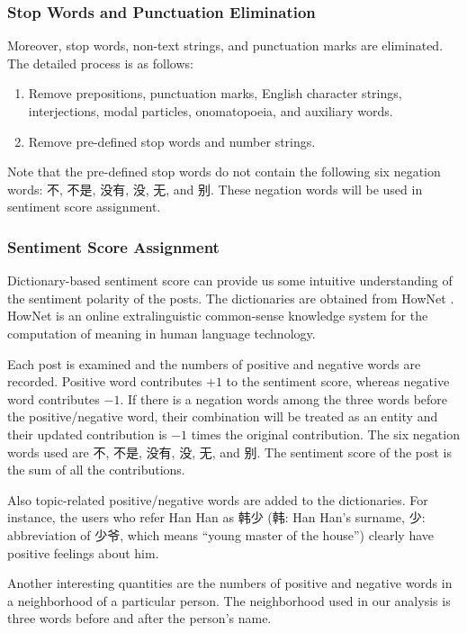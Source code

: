 \documentclass[11pt]{article}
\newcommand{\1}[1]{{\mathbf 1}\left\{#1\right\}}        %
\begin{document}
\subsubsection{Stop Words and Punctuation Elimination}
Moreover, stop words, non-text strings, and punctuation marks are eliminated. The detailed process is as follows: 
\begin{enumerate}
\item  Remove prepositions, punctuation marks, English character strings, interjections, modal particles, onomatopoeia, and auxiliary words.
\item Remove pre-defined stop words and number strings.
\end{enumerate}
Note that the pre-defined stop words do not contain the following six negation words:  不, 不是, 没有, 没, 无, and 别. These negation words will be used in sentiment score assignment.


\subsubsection{Sentiment Score Assignment}
Dictionary-based sentiment score can provide us some intuitive understanding of the sentiment polarity of the posts. 
The dictionaries are obtained from HowNet \cite{HowNet}. HowNet is an online extralinguistic common-sense knowledge system for the computation of meaning in human language technology.


Each post is examined and the numbers of positive and negative words are recorded. Positive word contributes $+1$ to the sentiment score, whereas negative word contributes $-1$. If there is a negation words among the three words before the positive/negative word, their combination will be treated as an entity and their updated contribution is $-1$ times the original contribution. The six negation words used are 不, 不是, 没有, 没, 无, and 别. The sentiment score of the post is the sum of all the contributions. 

Also topic-related positive/negative words are added to the dictionaries. For instance, the users who refer Han Han as 韩少 (韩: Han Han's surname, 少: abbreviation of 少爷, which means ``young master of the house'') clearly have positive feelings about him. 

Another interesting quantities are the numbers of positive and negative words in a neighborhood of a particular person. The neighborhood used in our analysis is three words before and after the person's name.
\end{document}

